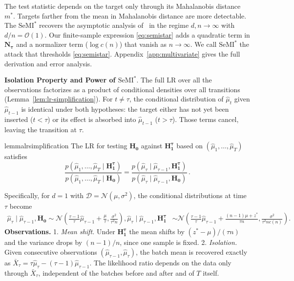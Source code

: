 \documentclass{article}
\theoremstyle{plain}
\theoremstyle{definition}
\theoremstyle{remark}
\newcommand{\cN}{\ensuremath{\mathcal{N}}}
\newcommand{\cD}{\ensuremath{\mathcal{D}}}
\newcommand{\SeMIstar}{\mathrm{SeMI}^{\ast}}
\begin{document}
The test statistic depends on the target only through its Mahalanobis distance $m^*$. Targets farther from the mean in Mahalanobis distance are more detectable. The $\SeMIstar$ recovers the asymptotic analysis of~\cite{azizeTargetsAreHarder2025} in the regime $d, n \to \infty$ with $d/n = \mathcal{O}(1)$. Our finite-sample expression  \eqref{eq:semistar} adds a quadratic term in $\mathbf{N_\tau}$ and a normalizer term ($\log c(n)$) that vanish as $n \to \infty$. We call $\SeMIstar$ the attack that thresholds \eqref{eq:semistar}. Appendix~\ref{app:multivariate} gives the full derivation and error analysis. %

\textbf{Isolation Property and Power of $\SeMIstar$}. The full LR over all the observations factorizes as a product of conditional densities over all transitions (Lemma~\ref{lem:lr-simplification}). For $t \neq \tau$, the conditional distribution of $\hat{\mu}_t$ given $\hat{\mu}_{t-1}$ is identical under both hypotheses: the target either has not yet been inserted ($t < \tau$) or its effect is absorbed into $\hat{\mu}_{t-1}$ ($t > \tau$). Those terms cancel, leaving the transition at $\tau$.
\begin{restatable}{lemma}{lrsimplification}
    \label{lem:lr-simplification}
    The LR for testing $\mathbf{H_0}$ against $\mathbf{H_1^\tau}$ based on $(\hat{\mu}_1, \ldots, \hat{\mu}_T)$ satisfies
    \begin{equation*}
        \frac{p(\hat{\mu}_1, \ldots, \hat{\mu}_T \mid \mathbf{H_1^\tau})}{p(\hat{\mu}_1, \ldots, \hat{\mu}_T \mid \mathbf{H_0})} = \frac{p(\hat{\mu}_\tau \mid \hat{\mu}_{\tau-1}, \mathbf{H_1^\tau})}{p(\hat{\mu}_\tau \mid \hat{\mu}_{\tau-1}, \mathbf{H_0})}\,.
    \end{equation*}
\end{restatable}
Specifically, for $d=1$ with $\cD = \cN(\mu, \sigma^2)$, the conditional distributions at time $\tau$ become
\begin{align*}
    \hat{\mu}_\tau \mid \hat{\mu}_{\tau-1}, \mathbf{H_0}       \sim \cN\left(\tfrac{\tau-1}{\tau} \hat{\mu}_{\tau-1} + \tfrac{\mu}{\tau}, \tfrac{\sigma^2}{\tau^2 n}\right),
    \hat{\mu}_\tau \mid \hat{\mu}_{\tau-1}, \mathbf{H_1^\tau} & \sim \cN\left(\tfrac{\tau-1}{\tau} \hat{\mu}_{\tau-1} + \tfrac{(n-1)\mu + z^*}{\tau n},\tfrac{\sigma^2}{\tau^2 n c(n)}\right).
\end{align*}
\textbf{Observations.} 1.\textit{ Mean shift.} Under $\mathbf{H_1^\tau}$ the mean shifts by $(z^*-\mu)/(\tau n)$ and the variance drops by $(n-1)/n$, since one sample is fixed.
2. \textit{Isolation.} Given consecutive observations $(\hat{\mu}_{\tau-1}, \hat{\mu}_\tau)$, the batch mean is recovered exactly as $\bar{X}_\tau = \tau \hat{\mu}_\tau - (\tau-1)\hat{\mu}_{\tau-1}$. The likelihood ratio depends on the data only through $\bar{X}_\tau$, independent of the batches before and after and of $T$ itself.
\end{document}
